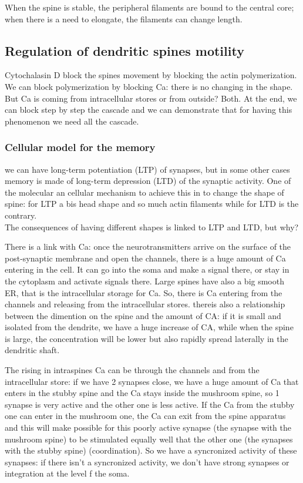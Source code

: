 \documentclass[a4paper, 12pt]{book}
\begin{document}
When the spine is stable, the peripheral filaments are bound to the central core; when there is a need to elongate, the filaments can change length.

\subsection{Regulation of dendritic spines motility}
Cytochalasin D block the spines movement by blocking the actin polymerization. We can block polymerization by blocking Ca: there is no changing in the shape. But Ca is coming from intracellular stores or from outside? Both. 
At the end, we can block step by step the cascade and we can demonstrate that for having this phenomenon we need all the cascade.

\subsubsection{Cellular model for the memory}
we can have long-term potentiation (LTP) of synapses, but in some other cases memory is made of long-term depression (LTD) of the synaptic activity. One of the molecular an cellular mechanism to achieve this in to change the shape of spine: for LTP a bis head shape and so much actin filaments while for LTD is the contrary.
\\

The consequences of having different shapes is linked to LTP and LTD, but why?

There is a link with Ca: once the neurotransmitters arrive on the surface of the post-synaptic membrane and open the channels, there is a huge amount of Ca entering in the cell. It can go into the soma and make a signal there, or stay in the cytoplasm and activate signals there. Large spines have also a big smooth ER, that is the intracellular storage for Ca. So, there is Ca entering from the channels and releasing from the intracellular stores. thereis also a relationship between the dimention on the spine and the amount of CA: if it is small and isolated from the dendrite, we have a huge increase of CA, while when the spine is large, the concentration will be lower but also rapidly spread laterally in the dendritic shaft.

The rising in intraspines Ca can be through the channels and from the intracellular store: if we have 2 synapses close, we have a huge amount of Ca that enters in the stubby spine and the Ca stays inside the mushroom spine, so 1 synapse is very active and the other one is less active. If the Ca from the stubby one can enter in the mushroom one, the Ca can exit from the spine apparatus and this will make possible for this poorly active synapse (the synapse with the mushroom spine) to be stimulated equally well that the other one (the synapses with the stubby spine) (coordination).  So we have a syncronized activity of these synapses: if there isn't a syncronized activity, we don't have strong synapses or integration at the level f the soma.
\end{document}
